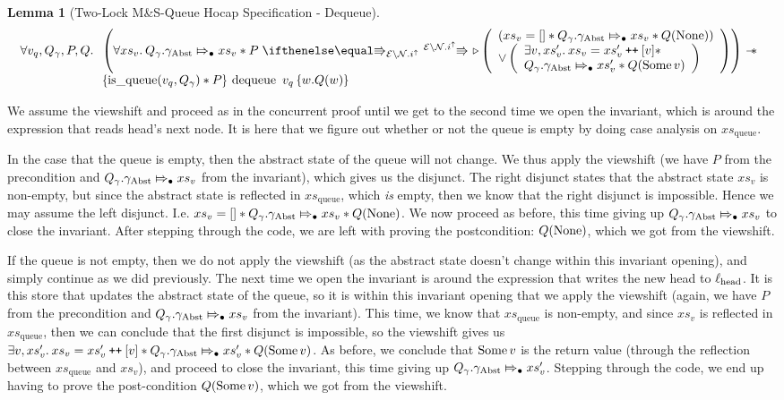 \documentclass[a4paper, 10pt]{report}
\theoremstyle{definition}
\newtheorem{lemma}[theorem]{Lemma}
\newcommand{\dequeue}{\operatorname{dequeue}}
\newcommand{\msq}{M\&S-Queue\xspace}
\newcommand{\tlmsq}{Two-Lock \msq}
\newcommand{\isqueue}{\operatorname{is\_queue}}
\newcommand{\vq}{v_q}
\newcommand{\xsqueue}{xs_{\mathrm{queue}}}
\newcommand{\locN}[1]{\loc_{\mathrm{#1}}}
\newcommand{\lochead}{\locN{head}}
\newcommand{\nodeval}{\valB}
\newcommand{\absvalue}{\val}
\newcommand{\absvalueList}{xs_v}
\newcommand{\Qg}{Q_\gname}
\newcommand{\gabst}{\gname_{\mathrm{Abst}}}
\newcommand\catenate{\mathbin{\text{\ttfamily\upshape ++}}}
\newcommand{\Nl}{\ensuremath{\mathcal{N}}}
\newcommand{\abstractstateauth}[2]{#1 \Mapsto_{\bullet} #2}
\newcommand{\tlhocapspecdeq}{\All \vq, \Qg, P, Q.
\begin{array}[t]{l}
\left(\All \absvalueList . \abstractstateauth{\Qg.\gabst}{\absvalueList} \star P \vs[\mask\setminus\Nl.i^\uparrow] \later
  \left(
    \begin{array}{l}
      (\absvalueList = [] \star \abstractstateauth{\Qg.\gabst}{\absvalueList} \star Q(\None))\\
      \lor
      \left(
        \begin{array}{l}
          \Exists \absvalue, \absvalueList' . \absvalueList = \absvalueList' \catenate [\absvalue] \star\\
          \abstractstateauth{\Qg.\gabst}{\absvalueList'} \star Q(\Some{\absvalue})
        \end{array}
        \right)
    \end{array}
  \right) \right)
\wand\\
\hoare{\isqueue(\vq, \Qg) \star P}{\dequeue \ \vq}{\nodeval . Q(\nodeval)}
\end{array}}
\begin{document}
\begin{lemma}[\tlmsq Hocap Specification - Dequeue]\label{TLMSQ:spec:hocap:dequeue}
  \begin{equation*}
    \tlhocapspecdeq
  \end{equation*}
\end{lemma}
We assume the viewshift and proceed as in the concurrent proof until we get to the second time we open the invariant, which is around the expression that reads head's next node. It is here that we figure out whether or not the queue is empty by doing case analysis on $\xsqueue$.

In the case that the queue is empty, then the abstract state of the queue will not change. We thus apply the viewshift (we have $P$ from the precondition and $\abstractstateauth{\Qg.\gabst}{\absvalueList}$ from the invariant), which gives us the disjunct. The right disjunct states that the abstract state $\absvalueList$ is non-empty, but since the abstract state is reflected in $\xsqueue$, which \emph{is} empty, then we know that the right disjunct is impossible. Hence we may assume the left disjunct. I.e. $\absvalueList = [] \star \abstractstateauth{\Qg.\gabst}{\absvalueList} \star Q(\None)$. We now proceed as before, this time giving up $\abstractstateauth{\Qg.\gabst}{\absvalueList}$ to close the invariant. After stepping through the code, we are left with proving the postcondition: $Q(\operatorname{None})$, which we got from the viewshift.

If the queue is not empty, then we do not apply the viewshift (as the abstract state doesn't change within this invariant opening), and simply continue as we did previously. The next time we open the invariant is around the expression that writes the new head to $\lochead$. It is this store that updates the abstract state of the queue, so it is within this invariant opening that we apply the viewshift (again, we have $P$ from the precondition and $\abstractstateauth{\Qg.\gabst}{\absvalueList}$ from the invariant). This time, we know that $\xsqueue$ is non-empty, and since $\absvalueList$ is reflected in $\xsqueue$, then we can conclude that the first disjunct is impossible, so the viewshift gives us $\Exists \absvalue, \absvalueList' . \absvalueList = \absvalueList' \catenate [\absvalue] \star \abstractstateauth{\Qg.\gabst}{\absvalueList'} \star Q(\Some{\absvalue})$. As before, we conclude that $\Some{\absvalue}$ is the return value (through the reflection between $\xsqueue$ and $\absvalueList$), and proceed to close the invariant, this time giving up $\abstractstateauth{\Qg.\gabst}{\absvalueList'}$. Stepping through the code, we end up having to prove the post-condition $Q(\Some{\absvalue})$, which we got from the viewshift.
\end{document}
